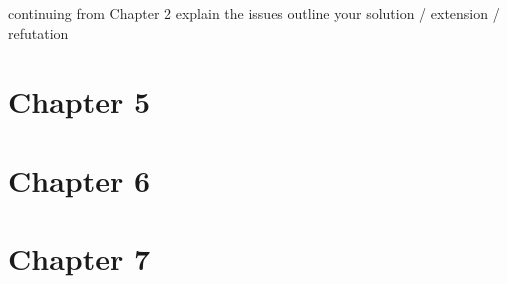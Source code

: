     continuing from Chapter 2 explain the issues
    outline your solution / extension / refutation
\fi

\section{Chapter 5}

\iffalse Implementation / Formalism (~15-30 pages)
    not every thesis has or needs an implementation
\fi

\section{Chapter 6}

\iffalse
Results and Evaluation (~15-30 pages)

    adequacy, efficiency, productiveness, effectiveness (choose your criteria, state them clearly and justify them)
    be careful that you are using a fair measure, and that you are actually measuring what you claim to be measuring
    if comparing with previous techniques those techniques must be described in Chapter 2
    be honest in evaluation
    admit weaknesses
\fi

\section{Chapter 7}
\iffalse
 Conclusions and Future Work (~5-10 pages)

    State what you've done and what you've found
    Summarize contributions (achievements and impact)
    Outline open issues/directions for future work
\fi

